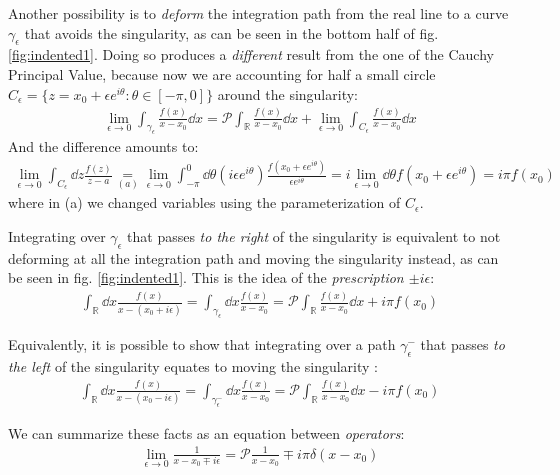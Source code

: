 \documentclass[../template.tex]{subfiles}
\begin{document}
Another possibility is to \textit{deform} the integration path from the real line to a curve $\gamma_{\epsilon}$ that avoids the singularity, as can be seen in the bottom half of fig. \ref{fig:indented1}. Doing so produces a \textit{different} result from the one of the Cauchy Principal Value, because now we are accounting for half a small circle $C_\epsilon = \{z = x_0 + \epsilon e^{i \theta} \colon \theta \in [-\pi, 0]\}$ around the singularity:
\begin{align} \label{eqn:diff}
    \lim_{\epsilon \to 0} \int_{\gamma_\epsilon} \frac{f(x)}{x-x_0} \dd{x} = \mathcal{P}\int_{\mathbb{R}} \frac{f(x)}{x-x_0} \dd{x} + 
    \lim_{\epsilon \to 0} \int_{C_{\epsilon}} \frac{f(x)}{x-x_0} \dd{x} 
\end{align} 
And the difference amounts to:
\begin{align*}
    \lim_{\epsilon \to 0} \int_{C_\epsilon} \dd{z} \frac{f(z)}{z-a} \underset{(a)}{=}  \lim_{\epsilon \to 0} \int_{-\pi}^0 \dd{\theta} (i \epsilon e^{i \theta}) \frac{f(x_0 + \epsilon e^{i \theta})}{\epsilon e^{i \theta}}  = i \lim_{\epsilon \to 0} \dd{\theta} f(x_0 + \epsilon e^{i \theta}) = i \pi f(x_0)
\end{align*}
where in (a) we changed variables using the parameterization of $C_\epsilon$.

\medskip

Integrating over $\gamma_\epsilon$ that passes \textit{to the right} of the singularity is equivalent to not deforming at all the integration path and moving the singularity  instead, as can be seen in fig. \ref{fig:indented1}. This is the idea of the \textit{prescription $\pm i \epsilon$}:
\begin{align*}
    \int_\mathbb{R} \dd{x} \frac{f(x)}{x-(x_0 + i \epsilon)} = \int_{\gamma_\epsilon} \dd{x} \frac{f(x)}{x-x_0} =  \mathcal{P}\int_{\mathbb{R}} \frac{f(x)}{x-x_0} \dd{x} + i \pi f(x_0)
\end{align*}  

Equivalently, it is possible to show that integrating over a path $\gamma_{\epsilon}^-$ that passes \textit{to the left} of the singularity equates to moving the singularity :
\begin{align*}
    \int_{\mathbb{R}} \dd{x} \frac{f(x)}{x-(x_0 - i \epsilon)} = \int_{\gamma_{\epsilon}^-} \dd{x} \frac{f(x)}{x- x_0} =  \mathcal{P}\int_{\mathbb{R}} \frac{f(x)}{x-x_0} \dd{x} - i \pi f(x_0)
\end{align*} 

We can summarize these facts as an equation between \textit{operators}:
\begin{align*}
    \lim_{\epsilon \to 0} \frac{1}{x - x_0 \mp i \epsilon} = \mathcal{P}\frac{1}{x - x_0} \mp i \pi \delta(x-x_0)  
\end{align*} 
\end{document}
